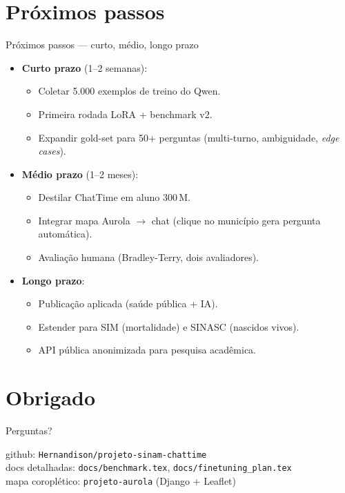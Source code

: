 \documentclass[10pt,aspectratio=169]{beamer}
\newcommand{\file}[1]{\texttt{\small #1}}
\begin{document}
\section{Próximos passos}

\begin{frame}{Próximos passos --- curto, médio, longo prazo}
\begin{itemize}\setlength\itemsep{0.3em}
\item \textbf{Curto prazo} (1--2 semanas):
\begin{itemize}\small
\item Coletar 5.000 exemplos de treino do Qwen.
\item Primeira rodada LoRA + benchmark v2.
\item Expandir gold-set para 50+ perguntas (multi-turno, ambiguidade,
\emph{edge cases}).
\end{itemize}
\item \textbf{Médio prazo} (1--2 meses):
\begin{itemize}\small
\item Destilar ChatTime em aluno 300\,M.
\item Integrar mapa Aurola $\to$ chat (clique no município gera
pergunta automática).
\item Avaliação humana (Bradley-Terry, dois avaliadores).
\end{itemize}
\item \textbf{Longo prazo}:
\begin{itemize}\small
\item Publicação aplicada (saúde pública + IA).
\item Estender para SIM (mortalidade) e SINASC (nascidos vivos).
\item API pública anonimizada para pesquisa acadêmica.
\end{itemize}
\end{itemize}
\end{frame}

\section*{Obrigado}

\begin{frame}[standout]
Perguntas?

\vspace{0.6em}
\small
\textcolor{white!70!black}{
github: \texttt{Hernandison/projeto-sinam-chattime}\\
docs detalhadas: \file{docs/benchmark.tex},
\file{docs/finetuning\_plan.tex}\\
mapa coroplético: \texttt{projeto-aurola} (Django + Leaflet)
}
\end{frame}
\end{document}
